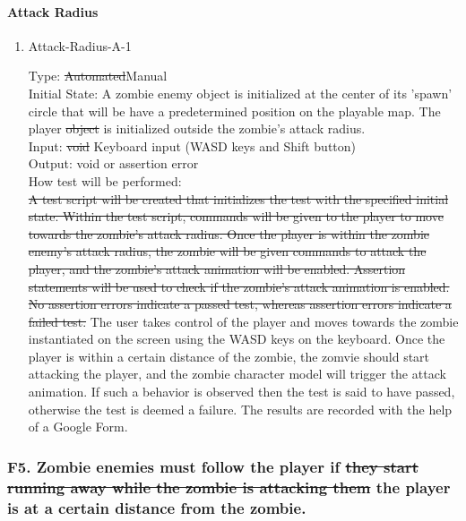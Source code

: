 \documentclass[12pt, titlepage]{article}
\DeclareRobustCommand{\hsout}[1]{\texorpdfstring{\sout{#1}}{#1}}
\newcounter{ftnum}
\begin{document}
\paragraph{Attack Radius}

\begin{enumerate}

\item{Attack-Radius-A-1\\}  \label{F4-1}

Type: \hsout{Automated}{\color{magenta}Manual}\\
					
Initial State: A zombie enemy object is initialized at the center of its 'spawn' circle that will be have a predetermined position on the playable map. The player \hsout{object} is initialized outside the zombie's attack radius.\\
					
Input: \hsout{void} {\color{magenta} Keyboard input (WASD keys and Shift button)} \\
					
Output: void or assertion error \\
					
How test will be performed:\\  \hsout{A test script will be created that initializes the test with the specified initial state. Within the test script, commands will be given to the player to move towards the zombie's attack radius.  Once the player is within the zombie enemy's attack radius, the zombie will be given commands to attack the player, and the zombie's attack animation will be enabled. Assertion statements will be used to check if the zombie's attack animation is enabled. No assertion errors indicate a passed test, whereas assertion errors indicate a failed test.}
{\color{magenta} The user takes control of the player and moves towards the zombie instantiated on the screen using the WASD keys on the keyboard. Once the player is within a certain distance of the zombie, the zomvie should start attacking the player, and the zombie character model will trigger the attack animation. If such a behavior is observed then the test is said to have passed, otherwise the test is deemed a failure. The results are recorded with the help of a Google Form.}\\

\end{enumerate}

\subsubsection{{\color{magenta} F5.} Zombie enemies must follow the player if \hsout{they start running away while the zombie is attacking them} {\color{magenta} the player is at a certain distance from the zombie.}} 
\end{document}
